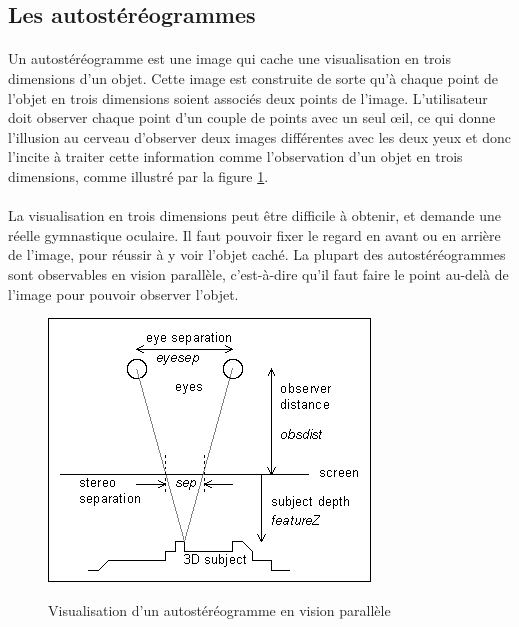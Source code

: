 \subsection{Les autostéréogrammes}	

\paragraph{}
	Un autostéréogramme est une image qui cache une visualisation en trois dimensions d’un objet. Cette image est construite de sorte qu'à chaque point de l'objet en trois dimensions soient associés deux points de l'image. L'utilisateur doit observer chaque point d'un couple de points avec un seul œil, ce qui donne l'illusion au cerveau d'observer deux images différentes avec les deux yeux et donc l'incite à traiter cette information comme l'observation d'un objet en trois dimensions, comme illustré par la figure \ref{fig:ppe_autostereogramme}.

\paragraph{}
	La visualisation en trois dimensions peut être difficile à obtenir, et demande une réelle gymnastique oculaire. Il faut pouvoir fixer le regard en avant ou en arrière de l’image, pour réussir à y voir l’objet caché. La plupart des autostéréogrammes sont observables en vision parallèle, c'est-à-dire qu'il faut faire le point au-delà de l'image pour pouvoir observer l'objet.

\begin{figure}[H]
  \centering
  \includegraphics[scale=0.7]{./ppe_autostereogramme.png}
  \label{fig:ppe_autostereogramme}
  \caption{Visualisation d’un autostéréogramme en vision parallèle \protect \footnotemark }
\end{figure}

